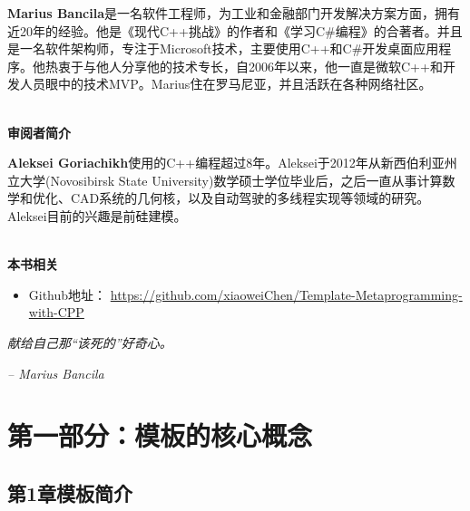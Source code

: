 \documentclass[11pt,a4paper,UTF8]{book}
\begin{document}
\begin{sloppypar}
		\textbf{Marius Bancila}是一名软件工程师，为工业和金融部门开发解决方案方面，拥有近20年的经验。他是《现代C++挑战》的作者和《学习C\#编程》的合著者。并且是一名软件架构师，专注于Microsoft技术，主要使用C++和C\#开发桌面应用程序。他热衷于与他人分享他的技术专长，自2006年以来，他一直是微软C++和开发人员眼中的技术MVP。Marius住在罗马尼亚，并且活跃在各种网络社区。
		
		\hspace*{\fill} \\ %
		\noindent\textbf{审阅者简介}
	
		\textbf{Aleksei Goriachikh}使用的C++编程超过8年。Aleksei于2012年从新西伯利亚州立大学(Novosibirsk State University)数学硕士学位毕业后，之后一直从事计算数学和优化、CAD系统的几何核，以及自动驾驶的多线程实现等领域的研究。Aleksei目前的兴趣是前硅建模。
		
		\hspace*{\fill} \\ %
		\noindent\textbf{本书相关}
		\begin{itemize}
			\item Github地址：
			\url{https://github.com/xiaoweiChen/Template-Metaprogramming-with-CPP}
		\end{itemize}
		\newpage
		
		\vspace*{\fill}
		\begin{center}
		\textit{献给自己那“该死的”好奇心。}
		
		\textit{– Marius Bancila}
		\end{center}
		\vspace*{\fill}
		\newpage
		
		\pagestyle{empty}
		
		\newpage
		
		\tableofcontents
		\newpage
		
		
		\color{white}
		\section*{第一部分：模板的核心概念}
		\pagecolor{mygray}
		\textbf{}
		\newpage
		\color{black}
		\pagecolor{white}
		
		\subsection*{ 第1章\hspace{0.5cm}模板简介}
		
		

\end{sloppypar}
\end{document}
